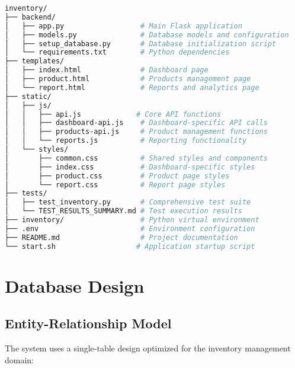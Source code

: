 \documentclass[12pt,a4paper]{article}
\begin{document}
\begin{lstlisting}[language=bash, caption=Project Directory Structure]
inventory/
├── backend/
│   ├── app.py                  # Main Flask application
│   ├── models.py               # Database models and configuration
│   ├── setup_database.py       # Database initialization script
│   └── requirements.txt        # Python dependencies
├── templates/
│   ├── index.html              # Dashboard page
│   ├── product.html            # Products management page
│   └── report.html             # Reports and analytics page
├── static/
│   ├── js/
│   │   ├── api.js             # Core API functions
│   │   ├── dashboard-api.js    # Dashboard-specific API calls
│   │   ├── products-api.js     # Product management functions
│   │   └── reports.js          # Reporting functionality
│   └── styles/
│       ├── common.css          # Shared styles and components
│       ├── index.css           # Dashboard-specific styles
│       ├── product.css         # Product page styles
│       └── report.css          # Report page styles
├── tests/
│   ├── test_inventory.py       # Comprehensive test suite
│   └── TEST_RESULTS_SUMMARY.md # Test execution results
├── inventory/                  # Python virtual environment
├── .env                        # Environment configuration
├── README.md                   # Project documentation
└── start.sh                   # Application startup script
\end{lstlisting}

\section{Database Design}

\subsection{Entity-Relationship Model}

The system uses a single-table design optimized for the inventory management domain:
\end{document}
